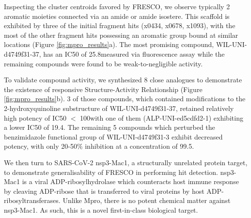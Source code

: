 
Inspecting the cluster centroids favored by FRESCO, we observe typically 2 aromatic moieties connected via an amide or amide isostere. This scaffold is exhibited by three of the initial fragment hits (x0434, x0678, x1093), with the most of the other fragment hits possessing an aromatic group bound at similar locations (Figure \ref{fig:mpro_results}a). The most promising compound, WIL-UNI-d4749f31-37, has an IC50 of 25.8\uM measured via fluorescence assay while the remaining compounds were found to be weak-to-negligible activity.

To validate compound activity, we synthesized 8 close analogues to demonstrate the existence of responsive Structure-Activity Relationship  \cite{Hermann2013ZincImpurity, Morreale2017ZincImpurity} (Figure \ref{fig:mpro_results}b). 3 of those compounds, which contained modifications to the 2-hydroxyquinoline substructure of WIL-UNI-d4749f31-37, retained relatively high potency of IC50 $<$ 100\uM with one of them (ALP-UNI-ed5cdfd2-1) exhibiting a lower IC50 of 19.4\uM. The remaining 5 compounds which perturbed the benzimidazole functional group of WIL-UNI-d4749f31-3 exhibit decreased potency, with only 20-50\% inhibition at a concentration of 99.5\uM.


We then turn to SARS-CoV-2 nsp3-Mac1, a structurally unrelated protein target, to demonstrate generalisability of FRESCO in performing hit detection. nsp3-Mac1 is a viral ADP-ribosylhydrolase which counteracts host immune response by cleaving ADP-ribose that is transferred to viral proteins by host ADP-ribosyltransferases. Unlike Mpro, there is no potent chemical matter against nsp3-Mac1. As such, this is a novel first-in-class biological target. 

